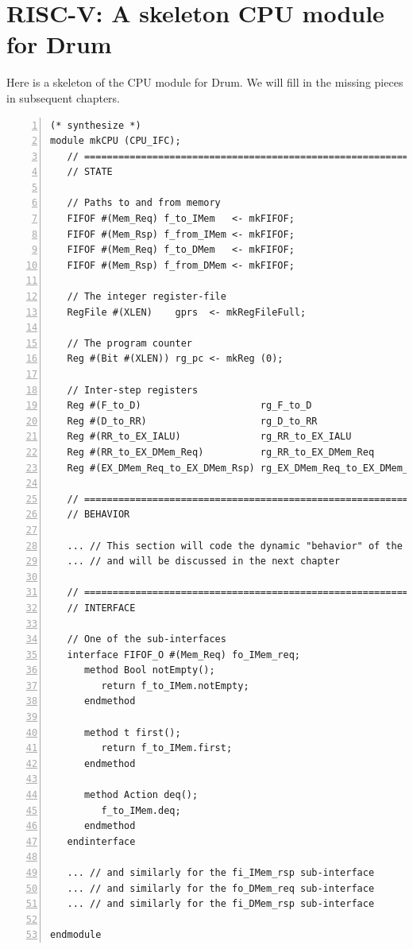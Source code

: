 
\section{RISC-V: A skeleton CPU module for Drum}

\label{Sec_CPU_Module_Skeleton_skeleton_CPU_module}


Here is a skeleton of the CPU module for Drum.  We will fill in
the missing pieces in subsequent chapters.

\begin{Verbatim}[frame=single, numbers=left]
(* synthesize *)
module mkCPU (CPU_IFC);
   // ================================================================
   // STATE

   // Paths to and from memory
   FIFOF #(Mem_Req) f_to_IMem   <- mkFIFOF;
   FIFOF #(Mem_Rsp) f_from_IMem <- mkFIFOF;
   FIFOF #(Mem_Req) f_to_DMem   <- mkFIFOF;
   FIFOF #(Mem_Rsp) f_from_DMem <- mkFIFOF;

   // The integer register-file
   RegFile #(XLEN)    gprs  <- mkRegFileFull;

   // The program counter
   Reg #(Bit #(XLEN)) rg_pc <- mkReg (0);

   // Inter-step registers
   Reg #(F_to_D)                     rg_F_to_D                  <- mkRegU;
   Reg #(D_to_RR)                    rg_D_to_RR                 <- mkRegU;
   Reg #(RR_to_EX_IALU)              rg_RR_to_EX_IALU           <- mkRegU;
   Reg #(RR_to_EX_DMem_Req)          rg_RR_to_EX_DMem_Req       <- mkRegU;
   Reg #(EX_DMem_Req_to_EX_DMem_Rsp) rg_EX_DMem_Req_to_EX_DMem_Rsp <- mkRegU;

   // ================================================================
   // BEHAVIOR

   ... // This section will code the dynamic "behavior" of the module
   ... // and will be discussed in the next chapter

   // ================================================================
   // INTERFACE

   // One of the sub-interfaces
   interface FIFOF_O #(Mem_Req) fo_IMem_req;
      method Bool notEmpty();
         return f_to_IMem.notEmpty;
      endmethod

      method t first();
         return f_to_IMem.first;
      endmethod

      method Action deq();
         f_to_IMem.deq;
      endmethod
   endinterface

   ... // and similarly for the fi_IMem_rsp sub-interface
   ... // and similarly for the fo_DMem_req sub-interface
   ... // and similarly for the fi_DMem_rsp sub-interface

endmodule

\end{Verbatim}

